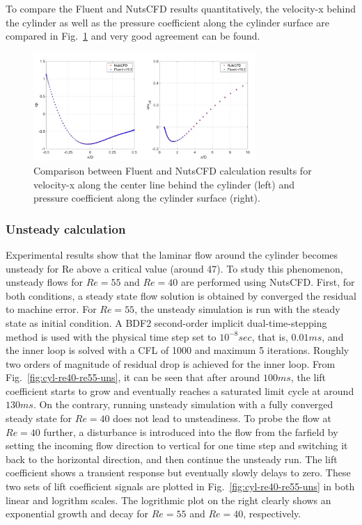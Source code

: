 \documentclass[journal,final]{new-aiaa}
\begin{document}
To compare the Fluent and NutsCFD results quantitatively, the velocity-x
behind the cylinder as well as the pressure coefficient along the cylinder
surface are compared in Fig.~\ref{fig:cyl-re55-u-cp} and very good agreement
can be found.
\begin{figure}[htb]
	\centering   
	\includegraphics[width=0.75\textwidth]{pic/cylinder-std-compare.png}
	\caption{Comparison between Fluent and NutsCFD calculation results for
		velocity-x along the center line behind the cylinder (left) and pressure
		coefficient along the cylinder surface (right).}
		\label{fig:cyl-re55-u-cp}
\end{figure}

\subsubsection{Unsteady calculation}
Experimental results show that the laminar flow around the cylinder
becomes unsteady for Re above a critical value (around 47). To study
this phenomenon, unsteady flows for $Re=55$ and $Re=40$
are performed using {\color{red} NutsCFD}. First, for both conditions, a steady
state flow solution is obtained by converged the residual to machine error.
For $Re=55$, the unsteady simulation is run with the steady state
as initial condition. A BDF2 second-order implicit dual-time-stepping
method is used with the physical time step set to $10^{-8} sec$, that is, $0.01 ms$,
and
the inner loop is solved with a CFL of 1000 and maximum 5 iterations.
Roughly two orders of magnitude of residual drop is achieved for the
inner loop. From Fig.~\ref{fig:cyl-re40-re55-uns}, it can be seen
that after around $100 ms$, the lift coefficient starts to grow and
eventually reaches a saturated limit cycle at around $130 ms$.
On the contrary, running unsteady simulation with a fully converged
steady state for $Re=40$ does not lead to unsteadiness. To probe
the flow at $Re=40$ further, a disturbance is introduced into the
flow from the farfield by setting the incoming flow direction to vertical
for one time step and switching it back to the horizontal direction,
and then continue the unsteady run. The lift coefficient shows a
transient response but eventually slowly delays to zero. These
two sets of lift coefficient signals are plotted in Fig.~\ref{fig:cyl-re40-re55-uns}
in both linear and logrithm scales. The logrithmic plot on the right
clearly shows an exponential growth and decay for $Re=55$ and $Re=40$,
respectively.
\end{document}
